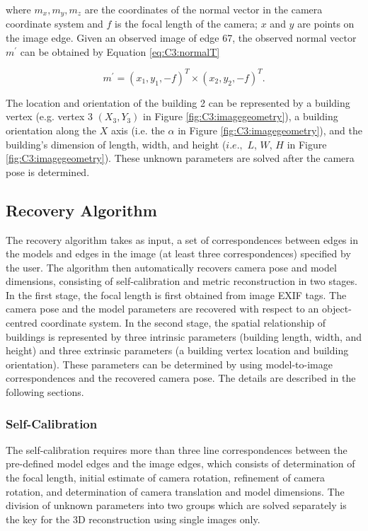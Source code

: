 where ${m_x, m_y, m_z}$ are the coordinates of the normal vector in the camera coordinate system and $f$ is the focal length of the camera; $x$ and $y$ are points on the image edge. Given an observed image of edge 67, the observed normal vector $m^{'}$ can be obtained by Equation \ref{eq:C3:normalT}

\begin{equation}
   m^{'} = (x_1, y_1, -f)^T \times (x_2, y_2, -f)^T.
\label{eq:C3:normalT}
\end{equation} 

The location and orientation of the building 2 can be represented by a building vertex (e.g. vertex 3 $(X_3, Y_3)$ in  Figure \ref{fig:C3:imagegeometry}), a building orientation along the $X$ axis (i.e. the $\alpha$ in Figure \ref{fig:C3:imagegeometry}), and the building’s dimension of length, width, and height ($i.e.,$ $L$, $W$, $H$ in Figure \ref{fig:C3:imagegeometry}). These unknown parameters are solved after the camera pose is determined. 

\subsection{Recovery Algorithm}

The recovery algorithm takes as input, a set of correspondences between edges in the models and edges in the image (at least three
correspondences) specified by the user. The algorithm then automatically recovers camera pose and model dimensions, consisting of self-calibration and metric reconstruction in two stages. In the first stage, the focal length is first obtained from image EXIF tags. The camera pose and the model parameters are recovered with respect to an object-centred coordinate system. In the second stage, the spatial relationship of buildings is represented by three intrinsic parameters (building length, width, and height) and three extrinsic parameters (a building vertex location and building orientation). These parameters can be determined by using model-to-image correspondences and the recovered camera pose. The details are described in the following sections.

\subsubsection{Self-Calibration}

The self-calibration requires more than three line correspondences between the pre-defined model edges and the image edges, which consists of determination of the focal length, initial estimate of camera rotation, refinement of camera rotation, and determination of camera translation and model dimensions. The division of unknown parameters into two groups which are solved separately is the key for the 3D reconstruction using single images only. 

